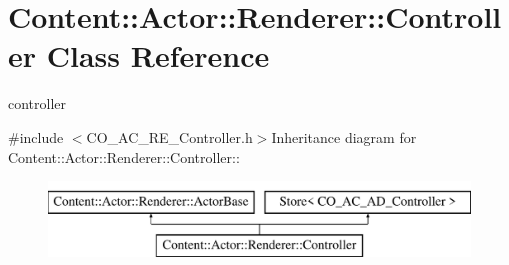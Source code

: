 \hypertarget{classContent_1_1Actor_1_1Renderer_1_1Controller}{
\section{Content::Actor::Renderer::Controller Class Reference}
\label{classContent_1_1Actor_1_1Renderer_1_1Controller}
}


controller  


{\ttfamily \#include $<$CO\_\-AC\_\-RE\_\-Controller.h$>$}Inheritance diagram for Content::Actor::Renderer::Controller::\begin{figure}[H]
\begin{center}
\leavevmode
\includegraphics[height=2cm]{classContent_1_1Actor_1_1Renderer_1_1Controller}
\end{center}
\end{figure}

